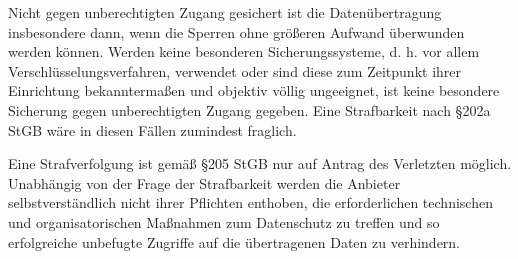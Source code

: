 \documentclass[10pt,a4paper]{article}
\begin{document}
Nicht gegen unberechtigten Zugang gesichert ist die Datenübertragung insbesondere dann, wenn die Sperren ohne größeren Aufwand überwunden werden können. Werden keine besonderen Sicherungssysteme, d. h. vor allem Verschlüsselungsverfahren, verwendet oder sind diese zum Zeitpunkt ihrer Einrichtung bekanntermaßen und objektiv völlig ungeeignet, ist keine besondere Sicherung gegen unberechtigten Zugang gegeben. Eine Strafbarkeit nach §202a StGB wäre in diesen Fällen zumindest fraglich.

Eine Strafverfolgung ist gemäß §205 StGB nur auf Antrag des Verletzten möglich. Unabhängig von der Frage der Strafbarkeit werden die Anbieter selbstverständlich nicht ihrer Pflichten enthoben, die erforderlichen technischen und organisatorischen Maßnahmen zum Datenschutz zu treffen und so erfolgreiche unbefugte Zugriffe auf die übertragenen Daten zu verhindern.
\end{document}
